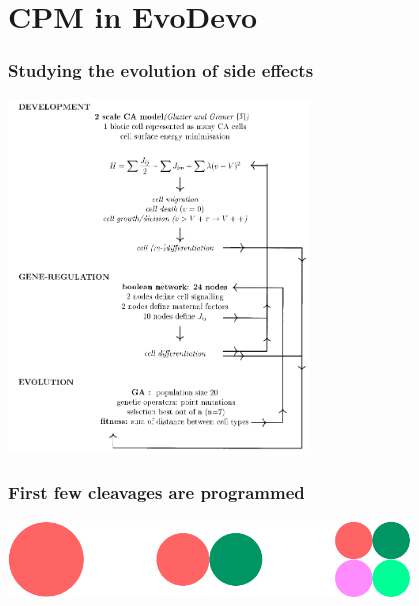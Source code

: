 \documentclass[compress]{beamer}
\begin{document}
\section{CPM in EvoDevo}
\begin{frame}
\frametitle{Studying the evolution of side effects}   
\begin{center}
     \includegraphics[width=0.6\textwidth]{figures/hogeweg_model.png}\\
    \end{center}
\end{frame}

\begin{frame}
\frametitle{First few cleavages are programmed}   
\begin{center}
     \includegraphics[width=0.8\textwidth]{figures/hogeweg_model2.pdf}\\
    \end{center}
\end{frame}
\end{document}

